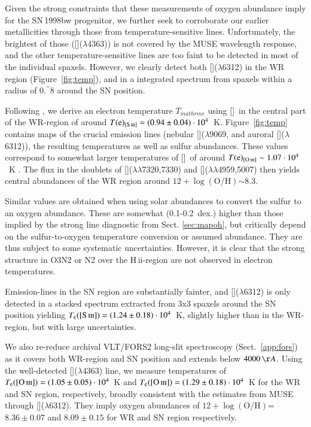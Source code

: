 \documentclass[traditabstract]{aa}
\newcommand{\farc}{\hbox{$.\!\!^{\prime\prime}$}}
\newcommand{\hii}{\mbox{H\,{\sc ii}}}
\newcommand{\oh}{$12+\log(\mathrm{O/H})$}
\newcommand{\siii}{[\ion{S}{iii}]}
\newcommand{\oii}{[\ion{O}{ii}]}
\newcommand{\oiii}{[\ion{O}{iii}]}
\begin{document}
Given the strong constraints that these measurements of oxygen abundance imply for the SN\,1998bw progenitor, we further seek to corroborate our earlier metallicities through those from temperature-sensitive lines. Unfortunately, the brightest of those (\oiii($\lambda$4363)) is not covered by the MUSE wavelength response, and the other temperature-sensitive lines are too faint to be detected in most of the individual spaxels. However, we clearly detect both \siii($\lambda$6312) in the WR region (Figure~\ref{fig:temp}), and in a integrated spectrum from spaxels within a radius of 0\farc{8} around the SN position.


Following \citet{2013ApJS..207...21N}, we derive an electron temperature $T_{mathrm{e}}$ using \siii\, in the central part of the WR-region of around $T(\mathrm{e})_{\siii}=(0.94\pm0.04)\cdot10^{4}$~K. Figure~\ref{fig:temp} contains maps of the crucial emission lines (nebular \siii($\lambda9069$, and auroral \siii($\lambda$6312)), the resulting temperatures as well as sulfur abundances. These values correspond to somewhat larger temperatures of \oiii~of around $T(\mathrm{e})_{\oiii} \sim 1.07\cdot10^{4}$~K \citep{2006A&A...448..955I, 2012A&A...547A..29B}. The flux in the doublets of \oii($\lambda\lambda$7320,7330) and \oiii($\lambda\lambda$4959,5007) then yields central abundances of the WR region around \oh $\sim 8.3$.

Similar values are obtained when using solar abundances to convert the sulfur to an oxygen abundance. These are somewhat (0.1-0.2~dex.) higher than those implied by the strong line diagnostic from Sect. \ref{sec:mapoh}, but critically depend on the sulfur-to-oxygen temperature conversion or assumed abundance. They are thus subject to some systematic uncertainties. However, it is clear that the strong structure in O3N2 or N2 over the \hii-region are not observed in electron temperatures.

Emission-lines in the SN region are substantially fainter, and \siii($\lambda$6312) is only detected in a stacked spectrum extracted from 3x3 spaxels around the SN position yielding $T_{\mathrm{e}}(\siii)=(1.24\pm0.18)\cdot10^{4}$~K, slightly higher than in the WR-region, but with large uncertainties.

We also re-reduce archival VLT/FORS2 long-slit spectroscopy (Sect.~\ref{app:fors}) as it covers both WR-region and SN position and extends below $4000\,\AA$. Using the well-detected \oiii($\lambda$4363) line, we measure temperatures of $T_{\mathrm{e}}(\oiii)=(1.05\pm0.05)\cdot 10^{4}$~K and $T_{\mathrm{e}}(\oiii)=(1.29\pm0.18)\cdot10^{4}$~K for the WR and SN region, respectively, broadly consistent with the estimates from MUSE through \siii($\lambda$6312). They imply oxygen abundances of \oh=$8.36\pm0.07$ and $8.09\pm0.15$ for WR and SN region respectively. %
\end{document}
